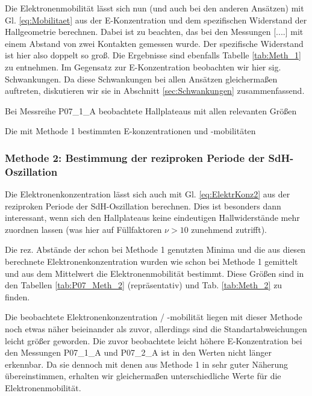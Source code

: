 Die Elektronenmobilität lässt sich nun (und auch bei den anderen Ansätzen) mit Gl. \ref{eq:Mobilitaet} aus der E-Konzentration und dem spezifischen Widerstand der Hallgeometrie berechnen. Dabei ist zu beachten, das bei den Messungen [....] mit einem Abstand von zwei Kontakten gemessen wurde. Der spezifische Widerstand ist hier also doppelt so groß. Die Ergebnisse sind ebenfalls Tabelle \ref{tab:Meth_1} zu entnehmen. Im Gegensatz zur E-Konzentration beobachten wir hier sig. Schwankungen. Da diese Schwankungen bei allen Ansätzen gleichermaßen auftreten, diskutieren wir sie in Abschnitt \ref{sec:Schwankungen} zusammenfassend.

\begin{table}
	\centering
	\caption{Bei Messreihe P07\_1\_A beobachtete Hallplateaus mit allen relevanten Größen}
	
	\label{tab:P07_Meth_1}
\end{table}
\begin{table}
	\centering
	\caption{Die mit Methode 1 bestimmten E-konzentrationen und -mobilitäten}
	
	\label{tab:Meth_1}
\end{table}

\newpage
\subsubsection{Methode 2: Bestimmung der reziproken Periode der SdH-Oszillation} \label{subsubsec:Meth_2}
Die Elektronenkonzentration lässt sich auch mit Gl. \ref{eq:ElektrKonz2} aus der reziproken Periode der SdH-Oszillation berechnen. Dies ist besonders dann interessant, wenn sich den Hallplateaus keine eindeutigen Hallwiderstände mehr zuordnen lassen (was hier auf Füllfaktoren $\nu > 10$ zunehmend zutrifft).

Die rez. Abstände der schon bei Methode 1 genutzten Minima und die aus diesen berechnete Elektronenkonzentration wurden wie schon bei Methode 1 gemittelt und aus dem Mittelwert die Elektronenmobilität bestimmt. Diese Größen sind in den Tabellen \ref{tab:P07_Meth_2} (repräsentativ) und Tab. \ref{tab:Meth_2} zu finden. 

Die beobachtete Elektronenkonzentration / -mobilität liegen mit dieser Methode noch etwas näher beieinander als zuvor, allerdings sind die Standartabweichungen leicht größer geworden. Die zuvor beobachtete leicht höhere E-Konzentration bei den Messungen P07\_1\_A und P07\_2\_A ist in den Werten nicht länger erkennbar. Da sie dennoch mit denen aus Methode 1 in sehr guter Näherung übereinstimmen, erhalten wir gleichermaßen unterschiedliche Werte für die Elektronenmobilität.
 
